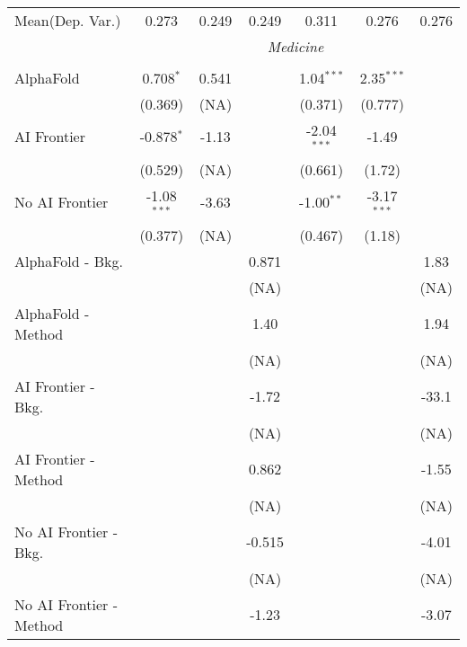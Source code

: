 \begin{tabular}{lcccccc}
Mean(Dep. Var.) & 0.273 & 0.249 & 0.249 & 0.311 & 0.276 & 0.276 \\
 & \multicolumn{6}{c}{\textit{Medicine}} \\ \\
   AlphaFold               & 0.708$^{*}$   & 0.541 &        & 1.04$^{***}$  & 2.35$^{***}$  &   \\   
                           & (0.369)       & (NA)  &        & (0.371)       & (0.777)       &   \\   
   AI Frontier             & -0.878$^{*}$  & -1.13 &        & -2.04$^{***}$ & -1.49         &   \\   
                           & (0.529)       & (NA)  &        & (0.661)       & (1.72)        &   \\   
   No AI Frontier          & -1.08$^{***}$ & -3.63 &        & -1.00$^{**}$  & -3.17$^{***}$ &   \\   
                           & (0.377)       & (NA)  &        & (0.467)       & (1.18)        &   \\   
   AlphaFold - Bkg.        &               &       & 0.871  &               &               & 1.83\\   
                           &               &       & (NA)   &               &               & (NA)\\   
   AlphaFold - Method      &               &       & 1.40   &               &               & 1.94\\   
                           &               &       & (NA)   &               &               & (NA)\\   
   AI Frontier - Bkg.      &               &       & -1.72  &               &               & -33.1\\   
                           &               &       & (NA)   &               &               & (NA)\\   
   AI Frontier - Method    &               &       & 0.862  &               &               & -1.55\\   
                           &               &       & (NA)   &               &               & (NA)\\   
   No AI Frontier - Bkg.   &               &       & -0.515 &               &               & -4.01\\   
                           &               &       & (NA)   &               &               & (NA)\\   
   No AI Frontier - Method &               &       & -1.23  &               &               & -3.07\\   

\end{tabular}
